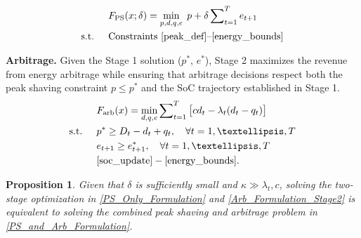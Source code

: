 \documentclass[10pt,a4paper]{amsart}
\newtheorem{proposition}{Proposition}
\begin{document}
\begin{equation}\label{PS_Only_Formulation}
\begin{aligned}
& F_{\text{PS}}(x;\delta) = \min_{p,d,q,e} \; p + \delta \sum\nolimits_{t=1}^T e_{t+1} \\
\text{s.t. } \quad
& \text{Constraints \eqref{peak_def}--\eqref{energy_bounds}}
\end{aligned}
\end{equation}

\textbf{Arbitrage.} 
Given the Stage 1 solution ($p^*$, $e^*$), Stage 2 maximizes the revenue from energy arbitrage while ensuring that arbitrage decisions respect both the peak shaving constraint $p \le p^*$ and the SoC trajectory established in Stage 1.
\begin{subequations}\label{Arb_Formulation_Stage2}
\begin{align}
& F_{\text{arb}}(x) = \min_{d,q,e} \sum\nolimits_{t=1}^T \big[ c d_t - \lambda_t (d_t - q_t) \big]
\label{arb_obj_min} \\
\text{s.t. } \quad
& p^* \ge D_t - d_t + q_t, 
\quad \forall t = 1,\dots,T
\label{peak_const_stage2} \\
& e_{t+1} \ge e_{t+1}^*, 
\quad \forall t = 1,\dots,T
\label{PS_SOC_min_stage2} \\
&  \eqref{soc_update}-\eqref{energy_bounds}. \nonumber
\end{align}
\end{subequations}

\begin{proposition}\label{Equivalence_Prop}
    Given that $\delta$ is sufficiently small and $\kappa \gg \lambda_t, c$, solving the two-stage optimization in \eqref{PS_Only_Formulation} and \eqref{Arb_Formulation_Stage2} is equivalent to solving the combined peak shaving and arbitrage problem in \eqref{PS_and_Arb_Formulation}.
\end{proposition}
\end{document}
